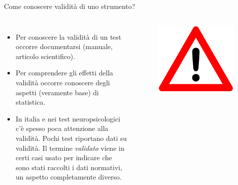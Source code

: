 \documentclass[
  ignorenonframetext,
]{beamer}
\begin{document}
\begin{frame}{Come conoscere validità di uno strumento?}
\label{come-conoscere-validituxe0-di-uno-strumento}
\begin{columns}
\begin{itemize}
\itemsep1em 

\item Per conoscere la validità di un test occorre documentarsi (manuale, articolo scientifico).

\item Per comprendere gli effetti della validità occorre conoscere degli aspetti (veramente base) di statistica.

\item In italia e nei test neuropsicologici c’è spesso poca attenzione alla validità. Pochi test riportano dati su validità. Il termine \emph{validato} viene in certi casi usato per indicare che sono stati raccolti i dati normativi, un aspetto completamente diverso.
\end{itemize}
\vspace{7em}
\begin{figure}
\includegraphics[scale=0.05]{Figures/triangle.png}
\end{figure}
\end{columns}
\end{frame}
\end{document}
